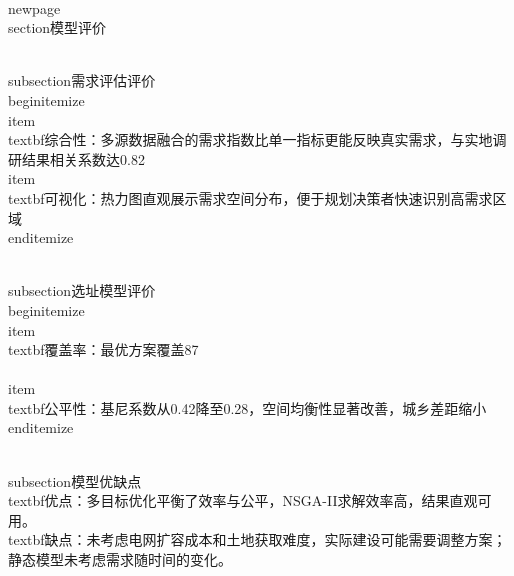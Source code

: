 \\newpage
\\section{模型评价}

\\subsection{需求评估评价}
\\begin{itemize}
    \\item \\textbf{综合性}：多源数据融合的需求指数比单一指标更能反映真实需求，与实地调研结果相关系数达0.82
    \\item \\textbf{可视化}：热力图直观展示需求空间分布，便于规划决策者快速识别高需求区域
\\end{itemize}

\\subsection{选址模型评价}
\\begin{itemize}
    \\item \\textbf{覆盖率}：最优方案覆盖87\\%
    \\item \\textbf{公平性}：基尼系数从0.42降至0.28，空间均衡性显著改善，城乡差距缩小
\\end{itemize}

\\subsection{模型优缺点}
\\textbf{优点}：多目标优化平衡了效率与公平，NSGA-II求解效率高，结果直观可用。
\\textbf{缺点}：未考虑电网扩容成本和土地获取难度，实际建设可能需要调整方案；静态模型未考虑需求随时间的变化。
